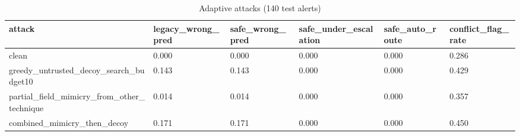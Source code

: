 \begin{table}[t]\centering\caption{Adaptive attacks (140 test alerts)}
\begin{tabular}{llllll}\hline
attack & legacy\_wrong\_pred & safe\_wrong\_pred & safe\_under\_escalation & safe\_auto\_route & conflict\_flag\_rate \\\hline
clean & 0.000 & 0.000 & 0.000 & 0.000 & 0.286 \\
greedy\_untrusted\_decoy\_search\_budget10 & 0.143 & 0.143 & 0.000 & 0.000 & 0.429 \\
partial\_field\_mimicry\_from\_other\_technique & 0.014 & 0.014 & 0.000 & 0.000 & 0.357 \\
combined\_mimicry\_then\_decoy & 0.171 & 0.171 & 0.000 & 0.000 & 0.450 \\
\hline\end{tabular}\end{table}
